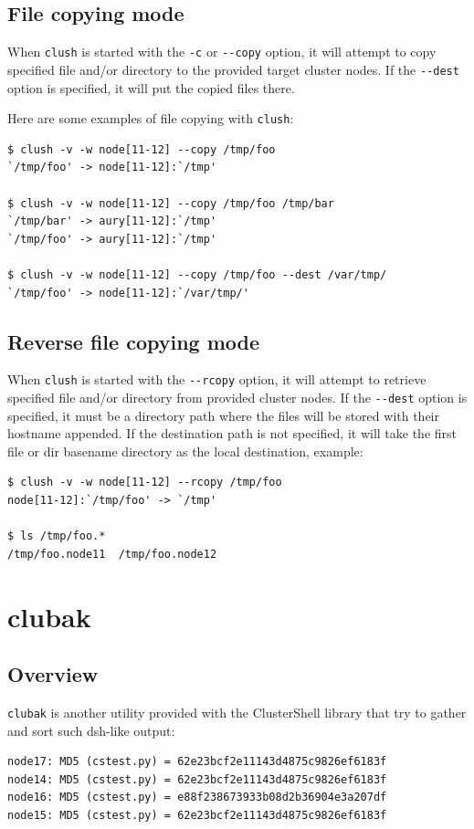 \documentclass[english,a4paper]{csuserguide}
\newcommand{\clush}{\texttt{clush}\xspace}
\newcommand{\clubak}{\texttt{clubak}\xspace}
\begin{document}
\subsection{File copying mode}

When \clush is started with  the \verb+-c+  or  \verb+--copy+  option, it will attempt to copy specified file and/or directory to the provided target cluster nodes. If the \verb+--dest+ option is specified, it will put the copied files there.

Here are some examples of file copying with \clush:
\bigskip

\begin{lstlisting}[breaklines=true, breakatwhitespace=true]
$ clush -v -w node[11-12] --copy /tmp/foo
`/tmp/foo' -> node[11-12]:`/tmp'

$ clush -v -w node[11-12] --copy /tmp/foo /tmp/bar
`/tmp/bar' -> aury[11-12]:`/tmp'
`/tmp/foo' -> aury[11-12]:`/tmp'

$ clush -v -w node[11-12] --copy /tmp/foo --dest /var/tmp/
`/tmp/foo' -> node[11-12]:`/var/tmp/'
\end{lstlisting}

\pagebreak[4]

\subsection{Reverse file copying mode}

When \clush  is started with the \verb+--rcopy+ option, it will attempt to retrieve specified file and/or directory from provided cluster nodes.  If the \verb+--dest+ option is specified, it must be a directory path where the files will  be  stored  with  their hostname appended. If the destination path is not specified, it will take the first file or dir basename directory as the local destination, example:
\bigskip

\begin{lstlisting}[breaklines=true, breakatwhitespace=true]
$ clush -v -w node[11-12] --rcopy /tmp/foo
node[11-12]:`/tmp/foo' -> `/tmp'

$ ls /tmp/foo.*
/tmp/foo.node11  /tmp/foo.node12
\end{lstlisting}




\section{clubak}

\subsection{Overview}
\clubak is another utility provided with the ClusterShell library that try to gather and sort such dsh-like output:
\begin{verbatim}
node17: MD5 (cstest.py) = 62e23bcf2e11143d4875c9826ef6183f
node14: MD5 (cstest.py) = 62e23bcf2e11143d4875c9826ef6183f
node16: MD5 (cstest.py) = e88f238673933b08d2b36904e3a207df
node15: MD5 (cstest.py) = 62e23bcf2e11143d4875c9826ef6183f
\end{verbatim}
\end{document}
